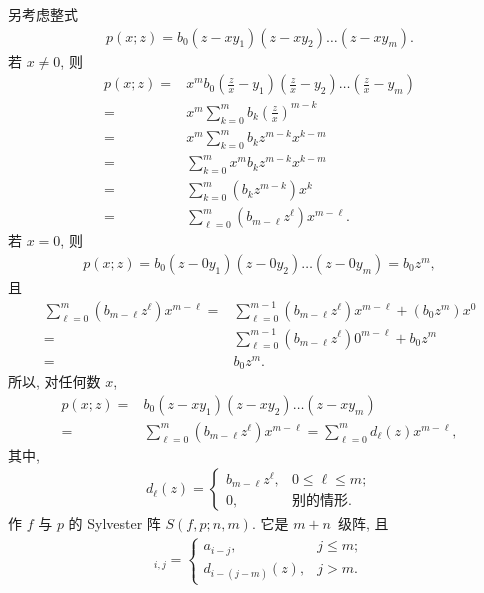 \documentclass[../libro.tex]{subfiles}
\begin{document}
另考虑整式
\begin{align*}
    p(x; z) = b_0 (z - x y_1) (z - x y_2) \dots (z - x y_m).
\end{align*}
若 \(x \neq 0\), 则
\begin{align*}
    p(x; z)
    = {} &
    x^m b_0
    \left(\frac{z}{x} - y_1\right)
    \left(\frac{z}{x} - y_2\right)
    \dots
    \left(\frac{z}{x} - y_m\right)
    \\
    = {} &
    x^m \sum_{k = 0}^{m} {b_k \left(\frac{z}{x}\right)^{m-k}}
    \\
    = {} &
    x^m \sum_{k = 0}^{m} {b_k z^{m-k} x^{k-m}}
    \\
    = {} &
    \sum_{k = 0}^{m} {x^m b_k z^{m-k} x^{k-m}}
    \\
    = {} &
    \sum_{k = 0}^{m} {(b_k z^{m-k}) x^k}
    \\
    = {} &
    \sum_{\ell = 0}^{m} {(b_{m-\ell} z^\ell) x^{m-\ell}}.
\end{align*}
若 \(x = 0\), 则
\begin{align*}
    p(x; z)
    = b_0 (z - 0 y_1) (z - 0 y_2) \dots (z - 0 y_m)
    = b_0 z^m,
\end{align*}
且
\begin{align*}
    \sum_{\ell = 0}^{m} {(b_{m-\ell} z^\ell) x^{m-\ell}}
    = {} &
    \sum_{\ell = 0}^{m-1} {(b_{m-\ell} z^\ell) x^{m-\ell}}
    + (b_0 z^m) x^0
    \\
    = {} &
    \sum_{\ell = 0}^{m-1} {(b_{m-\ell} z^\ell) 0^{m-\ell}}
    + b_0 z^m
    \\
    = {} &
    b_0 z^m.
\end{align*}
所以, 对任何数 \(x\),
\begin{align*}
    p(x; z)
    = {} &
    b_0 (z - x y_1) (z - x y_2) \dots (z - x y_m)
    \\
    = {} &
    \sum_{\ell = 0}^{m} {(b_{m-\ell} z^\ell) x^{m-\ell}}
    =
    \sum_{\ell = 0}^{m} {d_\ell (z) x^{m-\ell}},
\end{align*}
其中,
\begin{align*}
    d_\ell (z) =
    \begin{cases}
        b_{m-\ell} z^\ell, & 0 \leq \ell \leq m; \\
        0,                 & \text{别的情形}.
    \end{cases}
\end{align*}
作 \(f\) 与 \(p\) 的 Sylvester 阵 \(S(f, p; n, m)\).
它是 \(m + n\)~级阵, 且
\begin{align*}
    [S(f, p; n, m)]_{i,j} =
    \begin{cases}
        a_{i-j},         & j \leq m; \\
        d_{i-(j-m)} (z), & j > m.
    \end{cases}
\end{align*}
\end{document}
